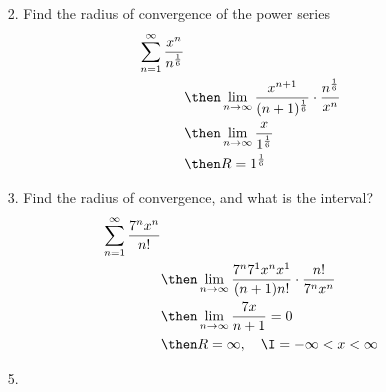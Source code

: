 \begin{itemize}
  \item[2.] Find the radius of convergence of the power series
    \begin{align*}
      \sum_{n= 1}^{\infty} \frac{x^n}{n^{\frac{1}{6}}} \\
      &\then \lim_{n \to \infty} \frac{x^{n+1}}{(n+1)^{\frac{1}{6}}} \cdot \frac{n^{\frac{1}{6}}}{x^n}\\
      &\then \lim_{n \to \infty} \frac{x}{1^{\frac{1}{6}}} \\
      &\then R = 1^{\frac{1}{6}}
    \end{align*}

  \item[3.] Find the radius of convergence, and what is the interval?
    \begin{align*}
      \sum_{n=1}^{\infty} \frac{7^n x^n }{n!} \\
      &\then \lim_{n \to \infty}\frac{7^n 7^1 x^n x^1}{(n+1)n!} \cdot \frac{n!}{7^n x^n } \\
      &\then \lim_{n \to \infty} \frac{7x}{n+1} = 0\\
      &\then R = \infty,\quad \I = -\infty < x < \infty
    \end{align*}

  \item[5.]
\end{itemize}
